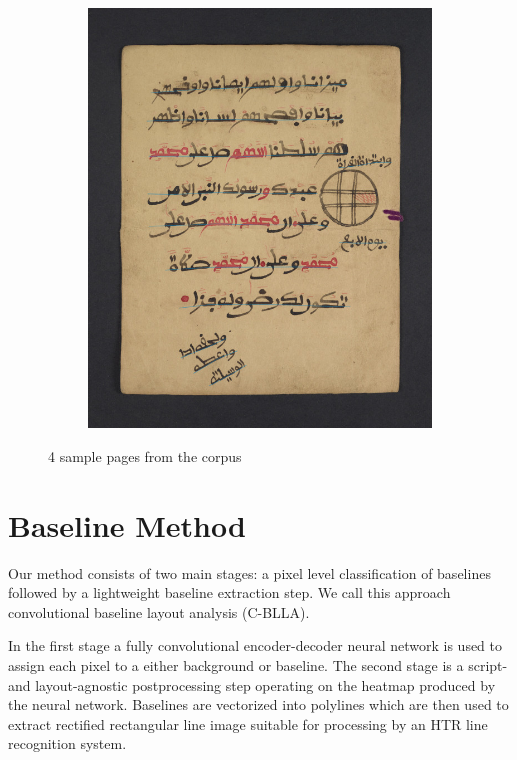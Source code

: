\begin{figure}[]
\begin{subfigure}[b]{.475\columnwidth}
		\includegraphics[height=0.45\textheight]{kufic.jpg}
	\end{subfigure}
	\caption{4 sample pages from the corpus}
	\label{fig:samples}
\end{figure}

\section{Baseline Method}

Our method consists of two main stages: a pixel level classification of
baselines followed by a lightweight baseline extraction step. We call this
approach convolutional baseline layout analysis (C-BLLA).

In the first stage a fully convolutional encoder-decoder neural network is used
to assign each pixel to a either background or baseline. The second stage is a
script- and layout-agnostic postprocessing step operating on the heatmap
produced by the neural network. Baselines are vectorized into polylines which
are then used to extract rectified rectangular line image suitable for
processing by an HTR line recognition system.

